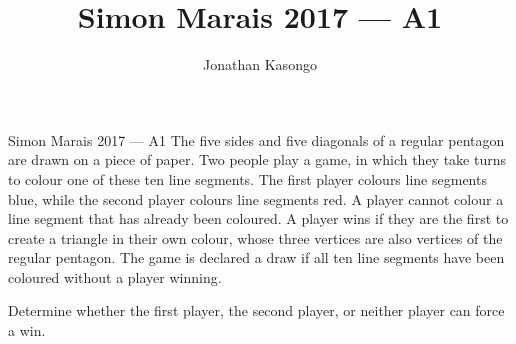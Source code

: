 \documentclass{article}
\author{Jonathan Kasongo}
\title{Simon Marais 2017 --- A1}
\begin{document}
\maketitle

\begin{problem}{Simon Marais 2017 --- A1}
The five sides and five diagonals of a regular pentagon are drawn on a piece of
paper. Two people play a game, in which they take turns to colour one of these ten
line segments. The first player colours line segments blue, while the second player
colours line segments red. A player cannot colour a line segment that has already
been coloured. A player wins if they are the first to create a triangle in their own
colour, whose three vertices are also vertices of the regular pentagon. The game is
declared a draw if all ten line segments have been coloured without a player winning.
\vspace{0.2cm}

Determine whether the first player, the second player, or neither player
can force a win.
\end{problem}
\end{document}
